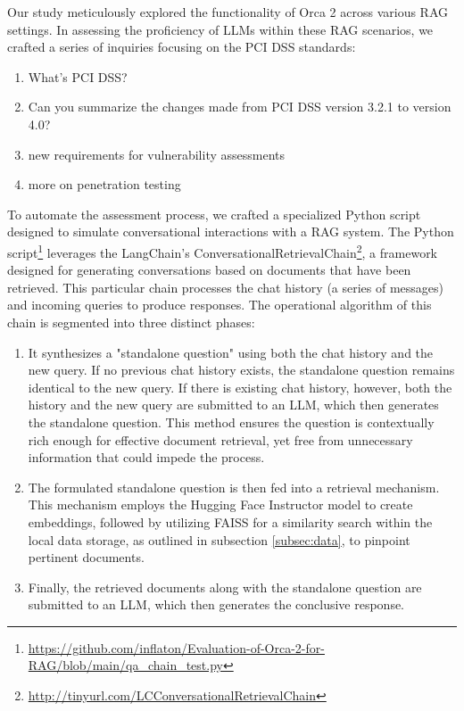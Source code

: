 \documentclass[runningheads]{llncs}
\begin{document}
Our study meticulously explored the functionality of Orca 2 across various RAG settings. In assessing the proficiency of LLMs within these RAG scenarios, we crafted a series of inquiries focusing on the PCI DSS standards:

\begin{enumerate}
    \item What's PCI DSS?
    \item Can you summarize the changes made from PCI DSS version 3.2.1 to version 4.0?
    \item new requirements for vulnerability assessments
    \item more on penetration testing
\end{enumerate}

To automate the assessment process, we crafted a specialized Python script designed to simulate conversational interactions with a RAG system. The Python script\footnote{\url{https://github.com/inflaton/Evaluation-of-Orca-2-for-RAG/blob/main/qa\_chain\_test.py}} leverages the LangChain's ConversationalRetrievalChain\footnote{\url{http://tinyurl.com/LCConversationalRetrievalChain}}, a framework designed for generating conversations based on documents that have been retrieved. This particular chain processes the chat history (a series of messages) and incoming queries to produce responses. The operational algorithm of this chain is segmented into three distinct phases:

\begin{enumerate}
    \item It synthesizes a "standalone question" using both the chat history and the new query. If no previous chat history exists, the standalone question remains identical to the new query. If there is existing chat history, however, both the history and the new query are submitted to an LLM, which then generates the standalone question. This method ensures the question is contextually rich enough for effective document retrieval, yet free from unnecessary information that could impede the process.
    \item The formulated standalone question is then fed into a retrieval mechanism. This mechanism employs the Hugging Face Instructor model to create embeddings, followed by utilizing FAISS for a similarity search within the local data storage, as outlined in subsection \ref{subsec:data}, to pinpoint pertinent documents.
    \item Finally, the retrieved documents along with the standalone question are submitted to an LLM, which then generates the conclusive response.
\end{enumerate}
\end{document}

